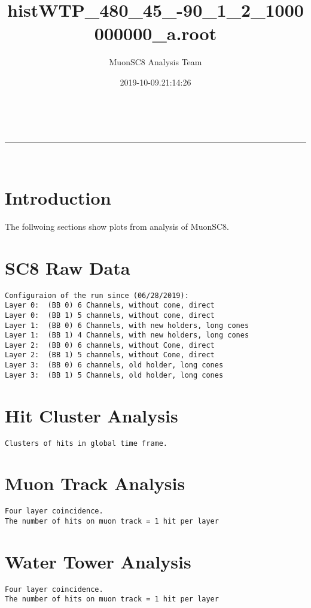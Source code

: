\documentclass[a4paper,11pt]{article}
\makeatletter
\newcommand{\linia}{\rule{\linewidth}{0.5pt}}
\theoremstyle{mytheor}
\renewcommand{\maketitle}{
\begin{center}
\vspace{2ex}
{\huge \textsc{\@title}}
\vspace{1ex}
\\
\linia\\
\@author \hfill \@date
\vspace{4ex}
\end{center}
}
\makeatother
\begin{document}
\title{histWTP\_480\_45\_-90\_1\_2\_1000000000\_a.root}

\author{MuonSC8 Analysis Team }

\date{2019-10-09.21:14:26}

\maketitle

\section{Introduction}

The follwoing sections show plots from analysis of MuonSC8. 






\section{SC8 Raw Data} 
\begin{verbatim} 
Configuraion of the run since (06/28/2019): 
Layer 0:  (BB 0) 6 Channels, without cone, direct 
Layer 0:  (BB 1) 5 channels, without cone, direct 
Layer 1:  (BB 0) 6 Channels, with new holders, long cones 
Layer 1:  (BB 1) 4 Channels, with new holders, long cones 
Layer 2:  (BB 0) 6 channels, without Cone, direct 
Layer 2:  (BB 1) 5 channels, without Cone, direct 
Layer 3:  (BB 0) 6 channels, old holder, long cones 
Layer 3:  (BB 1) 5 Channels, old holder, long cones 
\end{verbatim} 
\newpage 
\section{Hit Cluster Analysis} 
\begin{verbatim} 
Clusters of hits in global time frame. 
\end{verbatim} 
\newpage 
\section{Muon Track Analysis} 
\begin{verbatim} 
Four layer coincidence. 
The number of hits on muon track = 1 hit per layer  
\end{verbatim} 
\newpage 
\section{Water Tower Analysis} 
\begin{verbatim} 
Four layer coincidence. 
The number of hits on muon track = 1 hit per layer 
\end{verbatim} 
\end{document}
